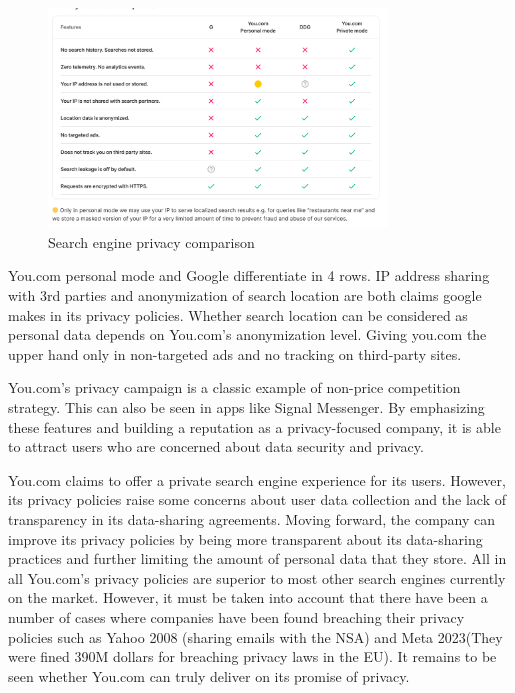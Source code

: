 \documentclass[5p,twocolumn,final]{elsarticle}
\begin{document}
\begin{figure}[h]
	\centering
	\includegraphics[width=9cm]{You.comVsGooglwe.png} %
	\caption{Search engine privacy comparison}
    \label{fig:fig2}
\end{figure}
\par 
You.com personal mode and Google differentiate in 4 rows. IP address sharing with 3rd parties and anonymization of search location are both claims google makes in its privacy policies. Whether search location can be considered as personal data depends on You.com's anonymization level. Giving you.com the upper hand only in non-targeted ads and no tracking on third-party sites.~\cite{youcom}\par
%
You.com’s privacy campaign is a classic example of non-price competition strategy. This can 
also be seen in apps like Signal Messenger. By emphasizing these features and building a reputation as a privacy-focused company, it is able to attract users who are concerned about data security and privacy.\par
%
You.com claims to offer a private search engine experience for its users. However, its privacy policies raise some concerns about user data collection and the lack of transparency in its data-sharing agreements.
 Moving forward, the company can improve its privacy policies by being more transparent about its data-sharing practices and further limiting the amount of personal data that they store. All in all You.com's privacy policies are superior to most other search engines currently on the market.
However, it must be taken into account that there have been a number of cases where  companies have been found breaching their privacy policies such as Yahoo 2008 (sharing emails with the NSA) and Meta 2023(They were fined 390M dollars for breaching privacy laws in the EU). It remains to be seen whether You.com can truly deliver on its promise of privacy.\par
%
\end{document}
